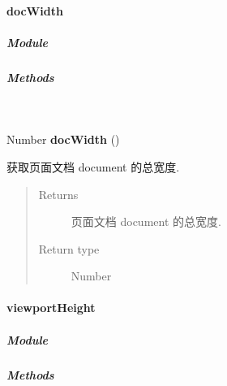 \documentclass[letterpaper,10pt,english]{sphinxmanual}
\begin{document}
\paragraph{docWidth}
\label{api/core/dom/docWidth::doc}\label{api/core/dom/docWidth:docwidth}

\subparagraph{Module}
\label{api/core/dom/docWidth:module}\begin{quote}

{\hyperref[api/core/dom/index:module-DOM]{}}
\end{quote}


\subparagraph{Methods}
\label{api/core/dom/docWidth:methods}

\begin{fulllineitems}
\label{api/core/dom/docWidth:DOM.docWidth}~
\begin{DUlineblock}{0em}
\item[] Number \textbf{docWidth} ()
\item[] 获取页面文档 document 的总宽度.
\end{DUlineblock}
\begin{quote}\begin{description}
\item[{Returns}] \leavevmode
页面文档 document 的总宽度.

\item[{Return type}] \leavevmode
Number

\end{description}\end{quote}

\end{fulllineitems}



\paragraph{viewportHeight}
\label{api/core/dom/viewportHeight::doc}\label{api/core/dom/viewportHeight:viewportheight}

\subparagraph{Module}
\label{api/core/dom/viewportHeight:module}\begin{quote}

{\hyperref[api/core/dom/index:module-DOM]{}}
\end{quote}


\subparagraph{Methods}
\label{api/core/dom/viewportHeight:methods}
\end{document}
